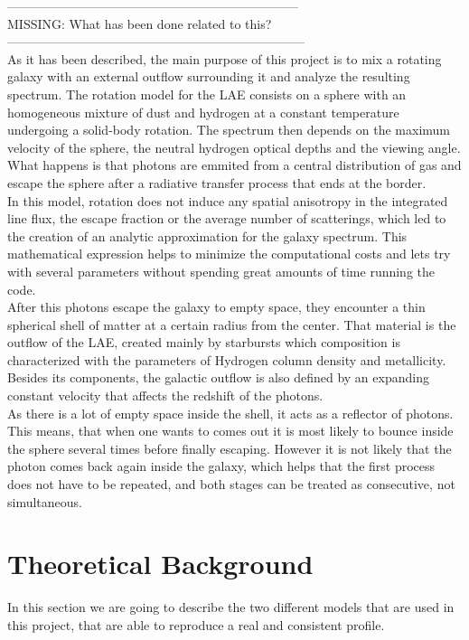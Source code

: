 \documentclass{latex/emulateapj}
\begin{document}
---------------------------------------------------------------------\\
MISSING: What has been done related to this?\\
-----------------------------------------------------------------------\\

As it has been described, the main purpose of this project is to mix a rotating galaxy with an external outflow surrounding it and analyze the resulting spectrum. The rotation model for the LAE consists on a sphere with an homogeneous mixture of dust and hydrogen at a constant temperature undergoing a solid-body rotation. The spectrum then depends on the maximum velocity of the sphere, the neutral hydrogen optical depths and the viewing angle. What happens is that photons are emmited from a central distribution of gas and escape the sphere after a radiative transfer process that ends at the border.\\

In this model, rotation does not induce any spatial anisotropy in the integrated line flux, the escape fraction or the average number of scatterings, which led to the creation of an analytic approximation for the galaxy spectrum. This mathematical expression helps to minimize the computational costs and lets try with several parameters without spending great amounts of time running the code. \\

After this photons escape the galaxy to empty space, they encounter a thin spherical shell of matter at a certain radius from the center. That material is the outflow of the LAE, created mainly by starbursts which composition is characterized with the parameters of Hydrogen column density and metallicity. Besides its components, the galactic outflow is also defined by an expanding constant velocity that affects the redshift of the photons.\\

As there is a lot of empty space inside the shell, it acts as a reflector of photons. This means, that when one wants to comes out it is most likely to bounce inside the sphere several times before finally escaping. However it is not likely that the photon comes back again inside the galaxy, which helps that the first process does not have to be repeated, and both stages can be treated as consecutive, not simultaneous. \\


\section{Theoretical Background}
\label{sec:theo}
In this section we are going to describe the two different models that are used in this project, that are able to reproduce a real and consistent \lya profile.\\
\end{document}
